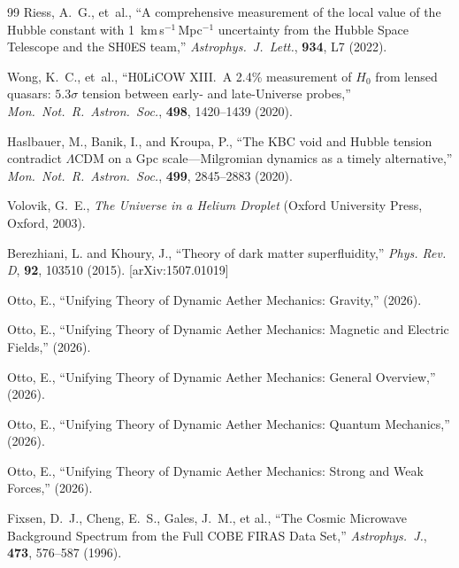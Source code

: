 ﻿\documentclass[12pt,letterpaper]{article}
\begin{document}
\begin{thebibliography}{99}
Riess, A.~G., et~al.,
``A comprehensive measurement of the local value of the Hubble constant with
1~km\,s$^{-1}$\,Mpc$^{-1}$ uncertainty from the Hubble Space Telescope and
the SH0ES team,''
\textit{Astrophys.\ J.\ Lett.}, \textbf{934}, L7 (2022).


Wong, K.~C., et~al.,
``H0LiCOW XIII.\ A 2.4\% measurement of $H_0$ from lensed quasars:
$5.3\sigma$ tension between early- and late-Universe probes,''
\textit{Mon.\ Not.\ R.\ Astron.\ Soc.}, \textbf{498}, 1420--1439 (2020).


Haslbauer, M., Banik, I., and Kroupa, P.,
``The KBC void and Hubble tension contradict $\Lambda$CDM on a Gpc scale---Milgromian
dynamics as a timely alternative,''
\textit{Mon.\ Not.\ R.\ Astron.\ Soc.}, \textbf{499}, 2845--2883 (2020).


Volovik, G.~E.,
\textit{The Universe in a Helium Droplet}
(Oxford University Press, Oxford, 2003).

Berezhiani, L. and Khoury, J.,
``Theory of dark matter superfluidity,''
\textit{Phys. Rev. D}, \textbf{92}, 103510 (2015).
[arXiv:1507.01019]

Otto, E.,
``Unifying Theory of Dynamic Aether Mechanics: Gravity,''
(2026).

Otto, E.,
``Unifying Theory of Dynamic Aether Mechanics: Magnetic and Electric Fields,''
(2026).

Otto, E.,
``Unifying Theory of Dynamic Aether Mechanics: General Overview,''
(2026).

Otto, E.,
``Unifying Theory of Dynamic Aether Mechanics: Quantum Mechanics,''
(2026).

Otto, E.,
``Unifying Theory of Dynamic Aether Mechanics: Strong and Weak Forces,''
(2026).

Fixsen, D.~J., Cheng, E.~S., Gales, J.~M., et al.,
``The Cosmic Microwave Background Spectrum from the Full COBE FIRAS Data Set,''
\textit{Astrophys.\ J.}, \textbf{473}, 576--587 (1996).
\end{thebibliography}
\end{document}
